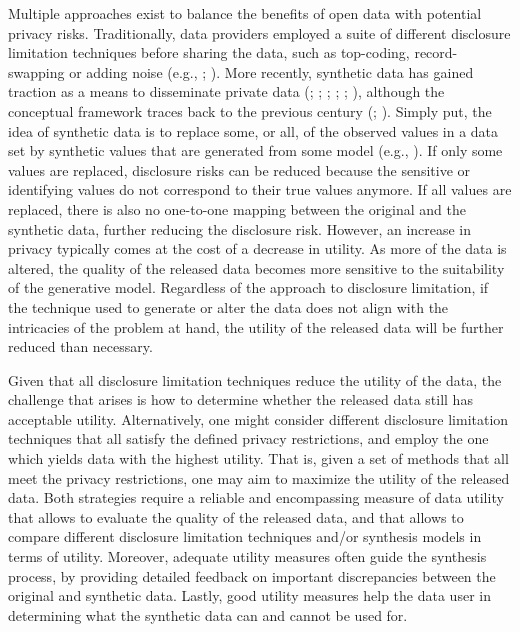 \documentclass[
]{article}
\begin{document}
Multiple approaches exist to balance the benefits of open data with
potential privacy risks. Traditionally, data providers employed a suite
of different disclosure limitation techniques before sharing the data,
such as top-coding, record-swapping or adding noise (e.g.,
;
).
More recently, synthetic data has gained traction as a means to
disseminate private data (; ;
;
;
;
), although the
conceptual framework traces back to the previous century
(;
). Simply put, the idea
of synthetic data is to replace some, or all, of the observed values in
a data set by synthetic values that are generated from some model (e.g.,
). If only some
values are replaced, disclosure risks can be reduced because the
sensitive or identifying values do not correspond to their true values
anymore. If all values are replaced, there is also no one-to-one mapping
between the original and the synthetic data, further reducing the
disclosure risk. However, an increase in privacy typically comes at the
cost of a decrease in utility. As more of the data is altered, the
quality of the released data becomes more sensitive to the suitability
of the generative model. Regardless of the approach to disclosure
limitation, if the technique used to generate or alter the data does not
align with the intricacies of the problem at hand, the utility of the
released data will be further reduced than necessary.

Given that all disclosure limitation techniques reduce the utility of
the data, the challenge that arises is how to determine whether the
released data still has acceptable utility. Alternatively, one might
consider different disclosure limitation techniques that all satisfy the
defined privacy restrictions, and employ the one which yields data with
the highest utility. That is, given a set of methods that all meet the
privacy restrictions, one may aim to maximize the utility of the
released data. Both strategies require a reliable and encompassing
measure of data utility that allows to evaluate the quality of the
released data, and that allows to compare different disclosure
limitation techniques and/or synthesis models in terms of utility.
Moreover, adequate utility measures often guide the synthesis process,
by providing detailed feedback on important discrepancies between the
original and synthetic data. Lastly, good utility measures help the data
user in determining what the synthetic data can and cannot be used for.
\end{document}
